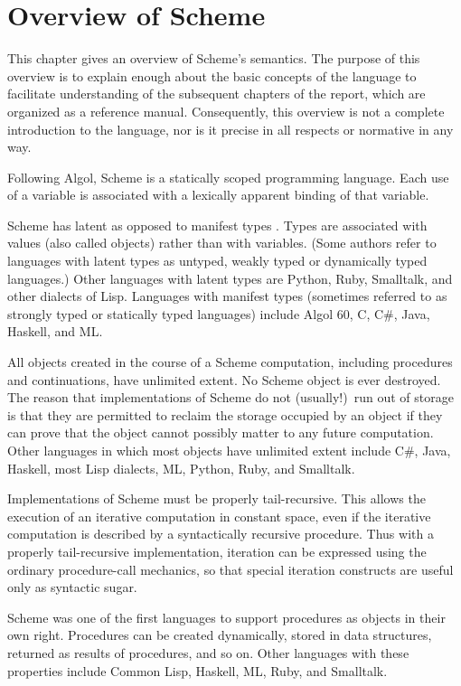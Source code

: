 \chapter{Overview of Scheme}
\label{semanticchapter}

This chapter gives an overview of Scheme's semantics.
The purpose of this overview is to explain
enough about the basic concepts of the language to facilitate
understanding of the subsequent chapters of the report, which are
organized as a reference manual.  Consequently, this overview is
not a complete introduction to the language, nor is it precise
in all respects or normative in any way.

\vest Following Algol, Scheme is a statically scoped programming
language.  Each use of a variable is associated with a lexically
apparent binding of that variable.

\vest Scheme has latent as opposed to manifest types
\cite{WaiteGoos}.  Types
are associated with values (also called objects) rather than
with variables.  (Some authors refer to languages with latent types as
untyped, weakly typed or dynamically typed languages.)  Other languages with
latent types are Python, Ruby, Smalltalk, and other dialects of Lisp.  Languages
with manifest types (sometimes referred to as strongly typed or
statically typed languages) include Algol 60, C, C\#, Java, Haskell, and ML.

\vest All objects created in the course of a Scheme computation, including
procedures and continuations, have unlimited extent.
No Scheme object is ever destroyed.  The reason that
implementations of Scheme do not (usually!)\ run out of storage is that
they are permitted to reclaim the storage occupied by an object if
they can prove that the object cannot possibly matter to any future
computation.  Other languages in which most objects have unlimited
extent include C\#, Java, Haskell, most Lisp dialects, ML, Python,
Ruby, and Smalltalk.

Implementations of Scheme must be properly tail-recursive.
This allows the execution of an iterative computation in constant space,
even if the iterative computation is described by a syntactically
recursive procedure.  Thus with a properly tail-recursive implementation,
iteration can be expressed using the ordinary procedure-call
mechanics, so that special iteration constructs are useful only as
syntactic sugar.

\vest Scheme was one of the first languages to support procedures as
objects in their own right.  Procedures can be created dynamically,
stored in data structures, returned as results of procedures, and so
on.  Other languages with these properties include Common Lisp,
Haskell, ML, Ruby, and Smalltalk.

